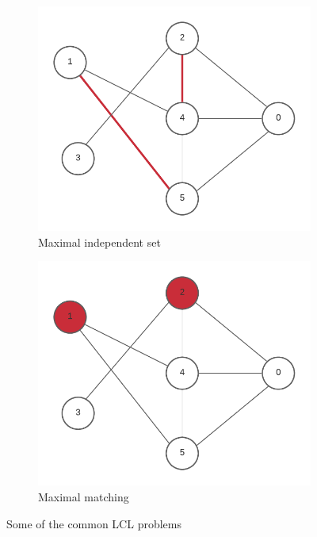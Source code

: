 \begin{figure}
  \hfill
  \begin{subfigure}[b]{0.49\textwidth}
      \centering
      \includegraphics[width=\textwidth]{images/maximal-ind-set.pdf}
      \caption{Maximal independent set}
      \label{fig:maximal-independent-set}
  \end{subfigure}
  \hfill
  \begin{subfigure}[b]{0.49\textwidth}
      \centering
      \includegraphics[width=\textwidth]{images/maximal-matching.pdf}
      \caption{Maximal matching}
      \label{fig:maximal-matching}
  \end{subfigure}
  \caption{Some of the common LCL problems}
  \label{fig:graph-problems}
\end{figure}

